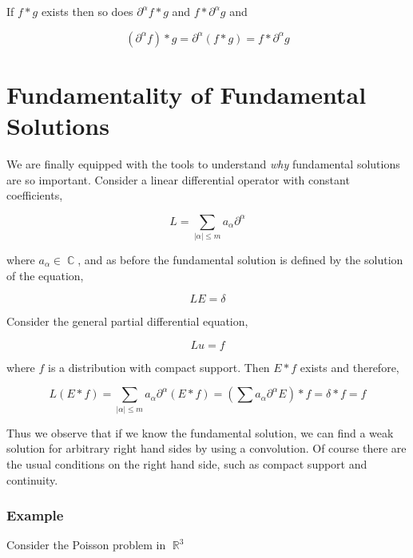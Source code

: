 \documentclass[12pt, a4]{article}
\DeclareMathOperator\reals{\mathbb{R}}
\DeclareMathOperator\complexes{\mathbb{C}}
\begin{document}
If $f*g$ exists then so does $\partial^\alpha f * g$ and $f * \partial^\alpha g$ and

\begin{equation}
    (\partial^\alpha f) * g = \partial^\alpha (f * g)  = f * \partial^\alpha g
\end{equation}


\section{Fundamentality of Fundamental Solutions}

We are finally equipped with the tools to understand \textit{why} fundamental solutions are so important. Consider a linear differential operator with constant coefficients,

\begin{equation}
    L = \sum_{|\alpha| \leq m } a_\alpha \partial^\alpha
\end{equation}

where $a_\alpha \in \complexes$, and as before the fundamental solution is defined by the solution of the equation,

\begin{equation}
    LE = \delta
\end{equation}

Consider the general partial differential equation,

\begin{equation}
    L u = f
\end{equation}

where $f$ is a distribution with compact support. Then $E*f$ exists and therefore,

\begin{equation}
    L(E*f) = \sum_{|\alpha| \leq m} a_\alpha \partial^\alpha (E*f) = \left(\sum a_\alpha \partial^\alpha E \right) * f = \delta * f = f
\end{equation}

Thus we observe that if we know the fundamental solution, we can find a weak solution for arbitrary right hand sides by using a convolution. Of course there are the usual conditions on the right hand side, such as compact support and continuity.

\subsubsection*{Example}

Consider the Poisson problem in $\reals^3$
\end{document}
